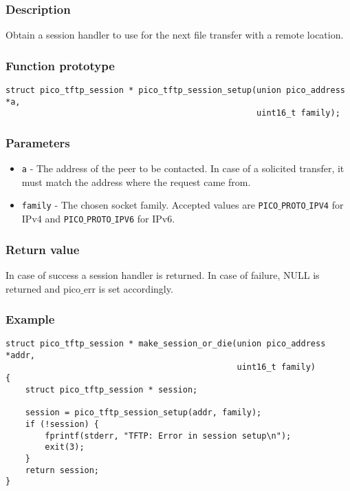 \subsubsection*{Description}
Obtain a session handler to use for the next file transfer with a remote location.

\subsubsection*{Function prototype}
\begin{verbatim}
struct pico_tftp_session * pico_tftp_session_setup(union pico_address *a,
                                                   uint16_t family);
\end{verbatim}

\subsubsection*{Parameters}
\begin{itemize}[noitemsep]
\item \texttt{a} - The address of the peer to be contacted. In case of a solicited transfer, it must match the address where the request came from.
\item \texttt{family} - The chosen socket family. Accepted values are \texttt{PICO$\_$PROTO$\_$IPV4} for IPv4 and \texttt{PICO$\_$PROTO$\_$IPV6} for IPv6.
\end{itemize}

\subsubsection*{Return value}
In case of success a session handler is returned. In case of failure, NULL is returned and pico$\_$err is set accordingly.

\subsubsection*{Example}
\begin{verbatim}
struct pico_tftp_session * make_session_or_die(union pico_address *addr,
                                               uint16_t family)
{
    struct pico_tftp_session * session;

    session = pico_tftp_session_setup(addr, family);
    if (!session) {
        fprintf(stderr, "TFTP: Error in session setup\n");
        exit(3);
    }
    return session;
}
\end{verbatim}


